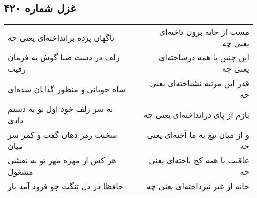 \begin{center}
\section*{غزل شماره ۴۲۰}
\label{sec:sh420}
\begin{longtable}{l p{0.5cm} r}
ناگهان پرده برانداخته‌ای یعنی چه
&&
مست از خانه برون تاخته‌ای یعنی چه
\\
زلف در دست صبا گوش به فرمان رقیب
&&
این چنین با همه درساخته‌ای یعنی چه
\\
شاه خوبانی و منظور گدایان شده‌ای
&&
قدر این مرتبه نشناخته‌ای یعنی چه
\\
نه سر زلف خود اول تو به دستم دادی
&&
بازم از پای درانداخته‌ای یعنی چه
\\
سخنت رمز دهان گفت و کمر سر میان
&&
و از میان تیغ به ما آخته‌ای یعنی چه
\\
هر کس از مهره مهر تو به نقشی مشغول
&&
عاقبت با همه کج باخته‌ای یعنی چه
\\
حافظا در دل تنگت چو فرود آمد یار
&&
خانه از غیر نپرداخته‌ای یعنی چه
\\
\end{longtable}
\end{center}
